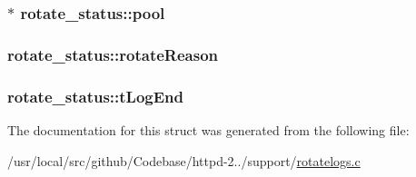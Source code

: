 \subsubsection[{\texorpdfstring{pool}{pool}}]{$\ast$ rotate\+\_\+status\+::pool}\hypertarget{structrotate__status_a415ad41c3e4e0166fa1388307798452e}{}\label{structrotate__status_a415ad41c3e4e0166fa1388307798452e}
\subsubsection[{\texorpdfstring{rotate\+Reason}{rotateReason}}]{ rotate\+\_\+status\+::rotate\+Reason}\hypertarget{structrotate__status_a2f72f950099644fd1bfd13345e0ee3d2}{}\label{structrotate__status_a2f72f950099644fd1bfd13345e0ee3d2}
\subsubsection[{\texorpdfstring{t\+Log\+End}{tLogEnd}}]{ rotate\+\_\+status\+::t\+Log\+End}\hypertarget{structrotate__status_a3105d9e9e30717aa497d702bf16105a8}{}\label{structrotate__status_a3105d9e9e30717aa497d702bf16105a8}


The documentation for this struct was generated from the following file\+:\begin{DoxyCompactItemize}
\item 
/usr/local/src/github/\+Codebase/httpd-\/2../support/\hyperlink{rotatelogs_8c}{rotatelogs.\+c}\end{DoxyCompactItemize}
